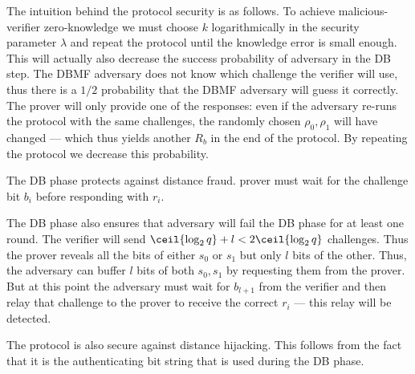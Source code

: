 The intuition behind the protocol security is as follows.
To achieve malicious-verifier zero-knowledge we must choose \(k\) 
logarithmically in the security parameter \(\lambda\) and repeat the protocol 
until the knowledge error is small enough.
This will actually also decrease the success probability of  adversary 
in the \ac{DB} step.
The \ac{DBMF} adversary does not know which challenge the verifier will use, 
thus there is a \(1/2\) probability that the \ac{DBMF} adversary will guess it 
correctly.
The prover will only provide one of the responses: even if the adversary re-runs 
the protocol with the same challenges, the randomly chosen \(\rho_0, \rho_1\) 
will have changed --- which thus yields another \(R_b\) in the end of the 
protocol.
By repeating the protocol we decrease this probability.

The \ac{DB} phase protects against distance fraud.
 prover must wait for the challenge bit \(b_i\) before responding with 
\(r_i\).

The \ac{DB} phase also ensures that  adversary will fail the \ac{DB} 
phase for at least one round.
The verifier will send \(\ceil{\log_2 q} + l < 2\ceil{\log_2 q}\) challenges.
Thus the prover reveals all the bits of either \(s_0\) or \(s_1\) but only \(l\) 
bits of the other.
Thus, the adversary can buffer \(l\) bits of both \(s_0, s_1\) by requesting 
them from the prover.
But at this point the adversary must wait for \(b_{l+1}\) from the verifier and 
then relay that challenge to the prover to receive the correct \(r_i\) --- this 
relay will be detected.

The protocol is also secure against distance hijacking.
This follows from the fact that it is the authenticating bit string that is used 
during the \ac{DB} phase.
